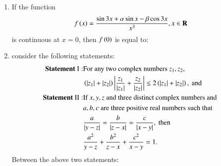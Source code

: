 \documentclass[journal]{IEEEtran}
\numberwithin{equation}{enumi}
\numberwithin{figure}{enumi}
\begin{document}
\begin{enumerate}
    \hfill{}

    \begin{enumerate}
    \end{enumerate}

    \item 
    If the function 
    \begin{align*}
        f\left(x\right) = \frac{\sin{3x} + \alpha\sin{x} - \beta\cos{3x}}{x^3}, x \in \mathbf{R}
    \end{align*}
    is continuous at $x = 0$, then $f\left(0\right)$ is equal to:

    \hfill{}

    \begin{enumerate}
    \end{enumerate}

    \item 
    consider the following statements: 
    \begin{align*}
        \textbf{Statement }\mathrm{I:} & \text{For any two complex numbers } z_1, z_2, \\
        & \left(\left\vert z_1\right\vert + \left\vert z_2\right\vert\right)\left\vert\frac{z_1}{\left\vert z_1\right\vert} + \frac{z_2}{\left\vert z_2\right\vert}\right\vert \leq 2\left(\left\vert z_1\right\vert + \left\vert z_2\right\vert\right), \text{ and }\\
        \textbf{Statement }\mathrm{II:} & \text{If } x, y, z \text{ and three distinct complex numbers and } \\
        & a, b, c \text{ are three positive real numbers such that } \\
        & \frac{a}{\left\vert y - z\right\vert} = \frac{b}{\left\vert z - x\right\vert} = \frac{c}{\left\vert x - y\right\vert}, \text{ then} \\
        & \frac{a^2}{y - z} + \frac{b^2}{z - x} + \frac{c^2}{x - y} = 1.
    \end{align*}
    Between the above two statements: 


\end{enumerate}
\end{document}

